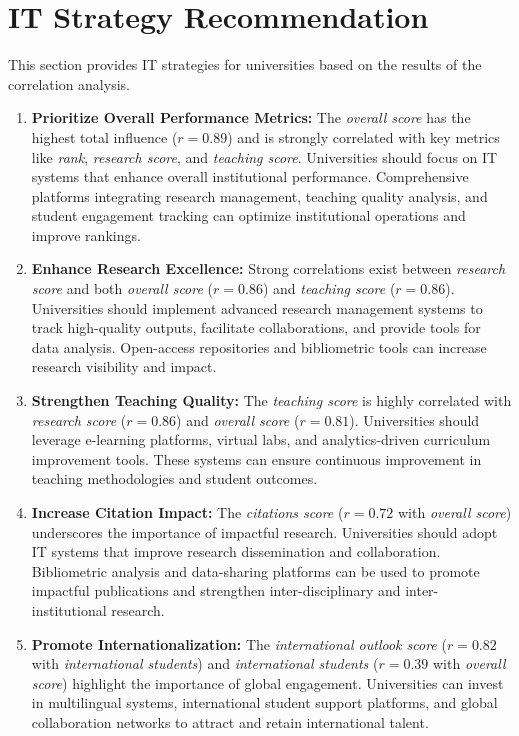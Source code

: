 \documentclass[conference]{IEEEtran}
\begin{document}
\section{IT Strategy Recommendation}

This section provides IT strategies for universities based on the results of the correlation analysis.

\begin{enumerate}
	\item \textbf{Prioritize Overall Performance Metrics:} The \textit{overall score} has the highest total influence (\(r = 0.89\)) and is strongly correlated with key metrics like \textit{rank}, \textit{research score}, and \textit{teaching score}. Universities should focus on IT systems that enhance overall institutional performance. Comprehensive platforms integrating research management, teaching quality analysis, and student engagement tracking can optimize institutional operations and improve rankings.
	
	\item \textbf{Enhance Research Excellence:} Strong correlations exist between \textit{research score} and both \textit{overall score} (\(r = 0.86\)) and \textit{teaching score} (\(r = 0.86\)). Universities should implement advanced research management systems to track high-quality outputs, facilitate collaborations, and provide tools for data analysis. Open-access repositories and bibliometric tools can increase research visibility and impact.
	
	\item \textbf{Strengthen Teaching Quality:} The \textit{teaching score} is highly correlated with \textit{research score} (\(r = 0.86\)) and \textit{overall score} (\(r = 0.81\)). Universities should leverage e-learning platforms, virtual labs, and analytics-driven curriculum improvement tools. These systems can ensure continuous improvement in teaching methodologies and student outcomes.
	
	\item \textbf{Increase Citation Impact:} The \textit{citations score} (\(r = 0.72\) with \textit{overall score}) underscores the importance of impactful research. Universities should adopt IT systems that improve research dissemination and collaboration. Bibliometric analysis and data-sharing platforms can be used to promote impactful publications and strengthen inter-disciplinary and inter-institutional research.
	
	\item \textbf{Promote Internationalization:} The \textit{international outlook score} (\(r = 0.82\) with \textit{international students}) and \textit{international students} (\(r = 0.39\) with \textit{overall score}) highlight the importance of global engagement. Universities can invest in multilingual systems, international student support platforms, and global collaboration networks to attract and retain international talent.
	

\end{enumerate}
\end{document}
